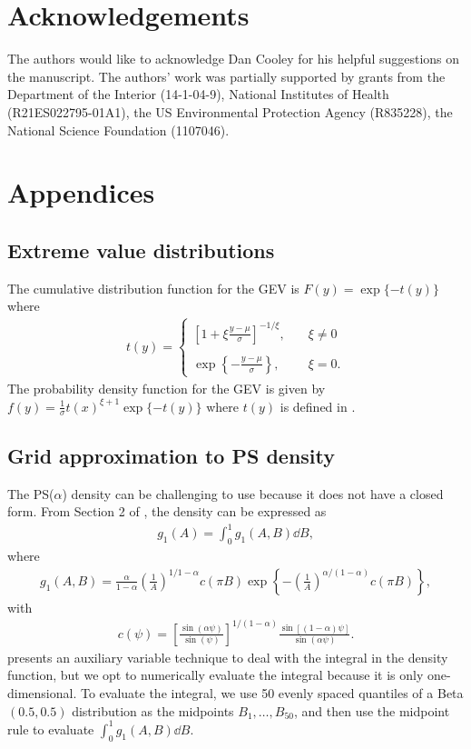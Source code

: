 \documentclass[aoas]{imsart}
\begin{document}
\section*{Acknowledgements}
The authors would like to acknowledge Dan Cooley for his helpful suggestions on the manuscript.
The authors' work was partially supported by grants from the Department of the Interior (14-1-04-9), National Institutes of Health (R21ES022795-01A1), the US Environmental Protection Agency (R835228), the National Science Foundation (1107046).

\appendix
\section{Appendices}
\subsection{Extreme value distributions} \label{eba:GEV}

The cumulative distribution function for the GEV is $F(y) = \exp\{-t(y)\}$ where
\begin{align} \label{ebeq:gevt}
  t(y) = \begin{cases}
      \left[1 + \xi \displaystyle \frac{y - \mu}{\sigma}\right]^{-1 / \xi}, \quad &\xi \neq 0 \\
      \\
      \exp\left\{- \displaystyle \frac{y - \mu}{\sigma}\right\}, &\xi = 0.
  \end{cases}
\end{align}
The probability density function for the GEV is given by $f(y) = \displaystyle \frac{1}{\sigma} t(x)^{\xi + 1} \exp\{-t(y)\}$ where $t(y)$ is defined in .

\subsection{Grid approximation to PS density} \label{eba:gridapprox}

The PS($\alpha$) density can be challenging to use because it does not have a closed form.
From Section 2 of \citep{Stephenson2009}, the density can be expressed as
\begin{align}
  g_1(A) = \int_0^1 g_1(A, B) \dd B,
\end{align}
where
\begin{align}
  g_1(A, B) = \frac{\alpha}{1 - \alpha} \left( \frac{1}{A} \right)^{1 / 1 - \alpha} c(\pi B) \exp \left\{ -\left(\frac{1}{A}\right)^{\alpha / (1 - \alpha)} c(\pi B) \right\},
\end{align}
with
\begin{align}
  c(\psi) = \left[\frac{\sin(\alpha \psi)}{\sin(\psi)}\right]^{1 / (1 - \alpha)} \frac{\sin[(1 - \alpha) \psi]}{\sin(\alpha \psi)}.
\end{align}
 presents an auxiliary variable technique to deal with the integral in the density function, but we opt to numerically evaluate the integral because it is only one-dimensional.
To evaluate the integral, we use 50 evenly spaced quantiles of a Beta$(0.5, 0.5)$ distribution as the midpoints $B_1, \ldots, B_{50}$, and then use the midpoint rule to evaluate $\displaystyle \int_0^1 g_1(A, B) \dd B$.
\end{document}
